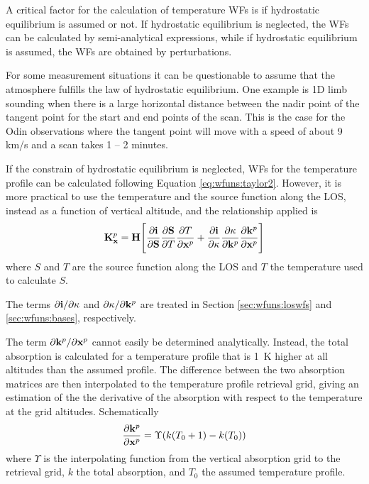  \label{sec:wfuns:temp}
 
 A critical factor for the calculation of temperature WFs is if
 hydrostatic equilibrium is assumed or not. If hydrostatic equilibrium
 is neglected, the WFs can be calculated by semi-analytical
 expressions, while if hydrostatic equilibrium is assumed, the WFs are
 obtained by perturbations.

 
 For some measurement situations it can be questionable to assume that
 the atmosphere fulfills the law of hydrostatic equilibrium. One
 example is 1D limb sounding when there is a large horizontal distance
 between the nadir point of the tangent point for the start and end
 points of the scan. This is the case for the Odin observations where
 the tangent point will move with a speed of about 9 km/s and a scan
 takes 1 -- 2 minutes.
 
 If the constrain of hydrostatic equilibrium is neglected, WFs for the
 temperature profile can be calculated following Equation
 \ref{eq:wfuns:taylor2}. However, it is more practical to use the
 temperature and the source function along the LOS, instead as a function
 of vertical altitude, and the relationship applied is
 \begin{equation}
    \mathbf{K}_{\mathbf{x}}^p = \mathbf{H} \Bigg[ \frac{\partial\mathbf{i}}{\partial \mathbf{S}}
                 \frac{\partial \mathbf{S}}{\partial T}
                 \frac{\partial T}{\partial \mathbf{x}^p} +
                 \frac{\partial\mathbf{i}}{\partial \kappa}
                 \frac{\partial \kappa}{\partial \mathbf{k}^p}
                 \frac{\partial \mathbf{k}^p}{\partial \mathbf{x}^p} \Bigg]
 \end{equation}
 where $S$ and $T$ are the source function along the LOS and $T$ the
 temperature used to calculate $S$.
 
 The terms $\partial \mathbf{i}/\partial \kappa$ and $\partial
 \kappa/\partial \mathbf{k}^p$ are treated in Section
 \ref{sec:wfuns:loswfs} and \ref{sec:wfuns:bases}, respectively.
 
 The term $\partial \mathbf{k}^p/\partial \mathbf{x}^p$ cannot easily be
 determined analytically. Instead, the total absorption is calculated
 for a temperature profile that is 1~K higher at all altitudes than
 the assumed profile. The difference between the two absorption
 matrices are then interpolated to the temperature profile retrieval
 grid, giving an estimation of the the derivative of the absorption
 with respect to the temperature at the grid altitudes. Schematically
 \begin{eqnarray}
   \frac{\partial \mathbf{k}^p}{\partial \mathbf{x}^p} = \Upsilon(k(T_0+1)-k(T_0))
     \nonumber
 \end{eqnarray}
 where $\Upsilon$ is the interpolating function from the vertical
 absorption grid to the retrieval grid, $k$ the total absorption, and
 $T_0$ the assumed temperature profile.
 
